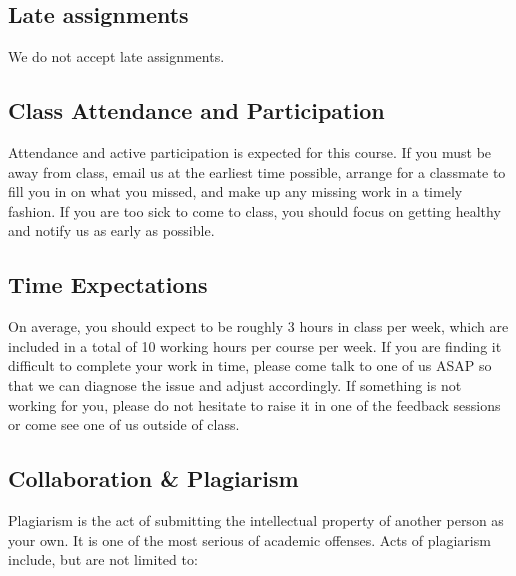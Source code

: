 \documentclass[
]{article}
\begin{document}
\hypertarget{late-assignments}{%
\subsection*{Late assignments}\label{late-assignments}}

We do not accept late assignments.

\hypertarget{class-attendance-and-participation}{%
\subsection*{Class Attendance and Participation}\label{class-attendance-and-participation}}

Attendance and active participation is expected for this course. If you must be away from class, email us at the earliest time possible, arrange for a classmate to fill you in on what you missed, and make up any missing work in a timely fashion. If you are too sick to come to class, you should focus on getting healthy and notify us as early as possible.

\hypertarget{time-expectations}{%
\subsection*{Time Expectations}\label{time-expectations}}

On average, you should expect to be roughly 3 hours in class per week, which are included in a total of 10 working hours per course per week. If you are finding it difficult to complete your work in time, please come talk to one of us ASAP so that we can diagnose the issue and adjust accordingly. If something is not working for you, please do not hesitate to raise it in one of the feedback sessions or come see one of us outside of class.

\hypertarget{collaboration-plagiarism}{%
\subsection*{Collaboration \& Plagiarism}\label{collaboration-plagiarism}}

Plagiarism is the act of submitting the intellectual property of another person as your own. It is one of the most serious of academic offenses. Acts of plagiarism include, but are not limited to:
\end{document}
